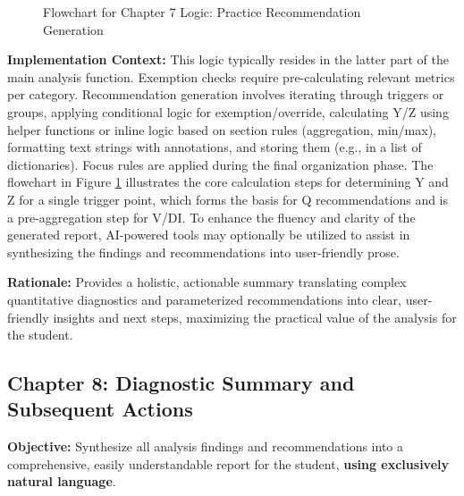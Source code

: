 \documentclass{article}
\begin{document}
\begin{figure}[htbp]
{
}

\vspace{\baselineskip}
\caption{Flowchart for Chapter 7 Logic: Practice Recommendation Generation}
\label{fig:chapter7_logic}
\end{figure}

\textbf{Implementation Context:} This logic typically resides in the latter part of the main analysis function. Exemption checks require pre-calculating relevant metrics per category. Recommendation generation involves iterating through triggers or groups, applying conditional logic for exemption/override, calculating Y/Z using helper functions or inline logic based on section rules (aggregation, min/max), formatting text strings with annotations, and storing them (e.g., in a list of dictionaries). Focus rules are applied during the final organization phase. The flowchart in Figure \ref{fig:chapter7_logic} illustrates the core calculation steps for determining Y and Z for a single trigger point, which forms the basis for Q recommendations and is a pre-aggregation step for V/DI. To enhance the fluency and clarity of the generated report, AI-powered tools may optionally be utilized to assist in synthesizing the findings and recommendations into user-friendly prose.

\textbf{Rationale:} Provides a holistic, actionable summary translating complex quantitative diagnostics and parameterized recommendations into clear, user-friendly insights and next steps, maximizing the practical value of the analysis for the student.

\subsection{Chapter 8: Diagnostic Summary and Subsequent Actions}

\textbf{Objective:} Synthesize all analysis findings and recommendations into a comprehensive, easily understandable report for the student, \textbf{using exclusively natural language}.
\end{document}

